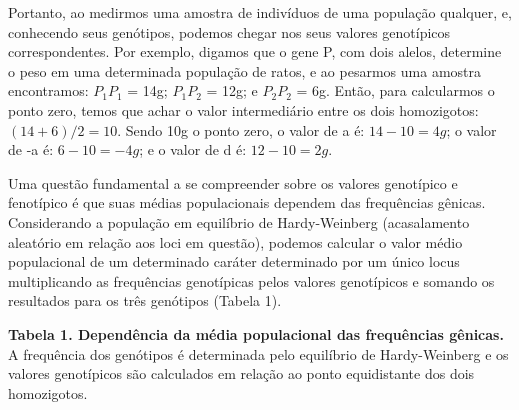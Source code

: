 \documentclass[portuges,]{tufte-handout}
\begin{document}
Portanto, ao medirmos uma amostra de indivíduos de uma população
qualquer, e, conhecendo seus genótipos, podemos chegar nos seus valores
genotípicos correspondentes. Por exemplo, digamos que o gene P, com dois
alelos, determine o peso em uma determinada população de ratos, e ao
pesarmos uma amostra encontramos: \(P_1\)\(P_1\) = 14g; \(P_1\)\(P_2\) =
12g; e \(P_2\)\(P_2\) = 6g. Então, para calcularmos o ponto zero, temos
que achar o valor intermediário entre os dois homozigotos:
\((14 + 6)/2 = 10\). Sendo 10g o ponto zero, o valor de a é:
\(14-10 = 4g\); o valor de -a é: \(6-10 = -4g\); e o valor de d é:
\(12-10 = 2g\).

Uma questão fundamental a se compreender sobre os valores genotípico e
fenotípico é que suas médias populacionais dependem das frequências
gênicas. Considerando a população em equilíbrio de Hardy-Weinberg
(acasalamento aleatório em relação aos loci em questão), podemos
calcular o valor médio populacional de um determinado caráter
determinado por um único locus multiplicando as frequências genotípicas
pelos valores genotípicos e somando os resultados para os três genótipos
(Tabela 1).

\textbf{Tabela 1. Dependência da média populacional das frequências
gênicas.} A frequência dos genótipos é determinada pelo equilíbrio de
Hardy-Weinberg e os valores genotípicos são calculados em relação ao
ponto equidistante dos dois homozigotos.
\end{document}
